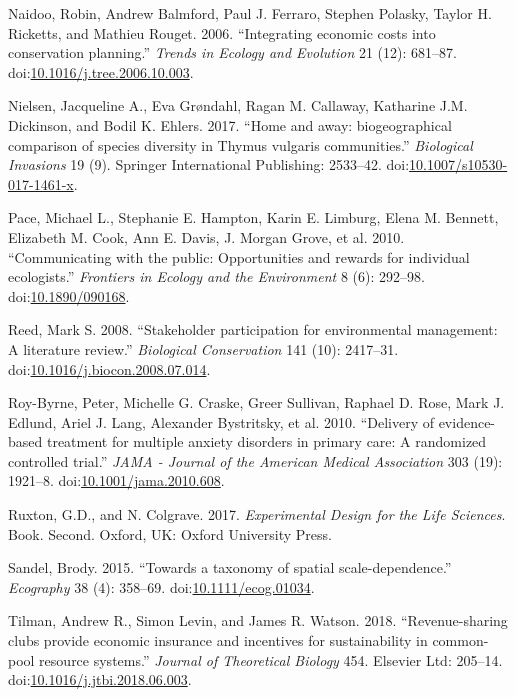 \documentclass[fleqn,10pt]{wlpeerj} %
\begin{document}
\hypertarget{ref-Naidoo2006}{}
Naidoo, Robin, Andrew Balmford, Paul J. Ferraro, Stephen Polasky, Taylor
H. Ricketts, and Mathieu Rouget. 2006. ``Integrating economic costs into
conservation planning.'' \emph{Trends in Ecology and Evolution} 21 (12):
681--87.
doi:\href{https://doi.org/10.1016/j.tree.2006.10.003}{10.1016/j.tree.2006.10.003}.

\hypertarget{ref-Nielsen2017}{}
Nielsen, Jacqueline A., Eva Grøndahl, Ragan M. Callaway, Katharine J.M.
Dickinson, and Bodil K. Ehlers. 2017. ``Home and away: biogeographical
comparison of species diversity in Thymus vulgaris communities.''
\emph{Biological Invasions} 19 (9). Springer International Publishing:
2533--42.
doi:\href{https://doi.org/10.1007/s10530-017-1461-x}{10.1007/s10530-017-1461-x}.

\hypertarget{ref-Pace2010}{}
Pace, Michael L., Stephanie E. Hampton, Karin E. Limburg, Elena M.
Bennett, Elizabeth M. Cook, Ann E. Davis, J. Morgan Grove, et al. 2010.
``Communicating with the public: Opportunities and rewards for
individual ecologists.'' \emph{Frontiers in Ecology and the Environment}
8 (6): 292--98.
doi:\href{https://doi.org/10.1890/090168}{10.1890/090168}.

\hypertarget{ref-Reed2008}{}
Reed, Mark S. 2008. ``Stakeholder participation for environmental
management: A literature review.'' \emph{Biological Conservation} 141
(10): 2417--31.
doi:\href{https://doi.org/10.1016/j.biocon.2008.07.014}{10.1016/j.biocon.2008.07.014}.

\hypertarget{ref-Roy-Byrne2010}{}
Roy-Byrne, Peter, Michelle G. Craske, Greer Sullivan, Raphael D. Rose,
Mark J. Edlund, Ariel J. Lang, Alexander Bystritsky, et al. 2010.
``Delivery of evidence-based treatment for multiple anxiety disorders in
primary care: A randomized controlled trial.'' \emph{JAMA - Journal of
the American Medical Association} 303 (19): 1921--8.
doi:\href{https://doi.org/10.1001/jama.2010.608}{10.1001/jama.2010.608}.

\hypertarget{ref-Ruxton2017}{}
Ruxton, G.D., and N. Colgrave. 2017. \emph{Experimental Design for the
Life Sciences}. Book. Second. Oxford, UK: Oxford University Press.

\hypertarget{ref-Sandel2015}{}
Sandel, Brody. 2015. ``Towards a taxonomy of spatial scale-dependence.''
\emph{Ecography} 38 (4): 358--69.
doi:\href{https://doi.org/10.1111/ecog.01034}{10.1111/ecog.01034}.

\hypertarget{ref-Tilman2018}{}
Tilman, Andrew R., Simon Levin, and James R. Watson. 2018.
``Revenue-sharing clubs provide economic insurance and incentives for
sustainability in common-pool resource systems.'' \emph{Journal of
Theoretical Biology} 454. Elsevier Ltd: 205--14.
doi:\href{https://doi.org/10.1016/j.jtbi.2018.06.003}{10.1016/j.jtbi.2018.06.003}.
\end{document}
